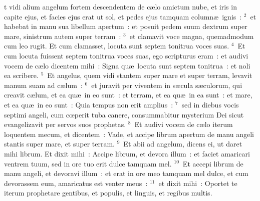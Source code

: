 \bchapter
{}t vidi alium angelum fortem descendentem de c\ae lo amictum nube, et iris in capite ejus, et facies ejus erat ut sol, et pedes ejus tamquam column\ae\ ignis~:
${}^{2}$~et habebat in manu sua libellum apertum~: et posuit pedem suum dextrum super mare, sinistrum autem super terram~:
${}^{3}$~et clamavit voce magna, quemadmodum cum leo rugit. Et cum clamasset, locuta sunt septem tonitrua voces suas.
${}^{4}$~Et cum locuta fuissent septem tonitrua voces suas, ego scripturus eram~: et audivi vocem de c\ae lo dicentem mihi~: Signa qu\ae\ locuta sunt septem tonitrua~: et noli ea scribere.
${}^{5}$~Et angelus, quem vidi stantem super mare et super terram, levavit manum suam ad c\ae lum~:
${}^{6}$~et juravit per viventem in s\ae cula s\ae culorum, qui creavit c\ae lum, et ea qu\ae\ in eo sunt~: et terram, et ea qu\ae\ in ea sunt~: et mare, et ea qu\ae\ in eo sunt~: Quia tempus non erit amplius~:
${}^{7}$~sed in diebus vocis septimi angeli, cum cœperit tuba canere, consummabitur mysterium Dei sicut evangelizavit per servos suos prophetas.
${}^{8}$~Et audivi vocem de c\ae lo iterum loquentem mecum, et dicentem~: Vade, et accipe librum apertum de manu angeli stantis super mare, et super terram.
${}^{9}$~Et abii ad angelum, dicens ei, ut daret mihi librum. Et dixit mihi~: Accipe librum, et devora illum~: et faciet amaricari ventrem tuum, sed in ore tuo erit dulce tamquam mel.
${}^{10}$~Et accepi librum de manu angeli, et devoravi illum~: et erat in ore meo tamquam mel dulce, et cum devorassem eum, amaricatus est venter meus~:
${}^{11}$~et dixit mihi~: Oportet te iterum prophetare gentibus, et populis, et linguis, et regibus multis.

